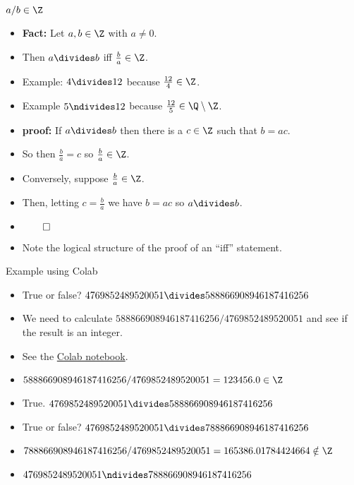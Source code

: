 \documentclass[handout]{beamer}
\begin{document}
\begin{frame}{$a/b \in \Z$}

\begin{itemize}
  \item \textbf{Fact:} Let $a,b\in\Z$ with $a\not=0$.
  \item Then $a\divides b$ iff $\frac{b}{a} \in \Z$.
  \item Example: $4 \divides 12$ because $\frac{12}{4} \in \Z$.
  \item Example $5 \ndivides 12$ because $\frac{12}{5} \in \Q \setminus \Z$.
  \item \textbf{proof:} If $a\divides b$ then there is a $c\in\Z$ such that
  $b = ac$.
  \item So then $\frac{b}{a} = c$ so $\frac{b}{a} \in \Z$.
  \item Conversely, suppose $\frac{b}{a} \in \Z$.
  \item Then, letting $c = \frac{b}{a}$ we have $b = a c$ so $a\divides b$.
  \item $\qed$
  \item Note the logical structure of the proof of an ``iff'' statement.
\end{itemize}

\end{frame}


\begin{frame}{Example using Colab}

\begin{itemize}
  \item True or false? $4769852489520051 \divides 588866908946187416256$
  \item We need to calculate $588866908946187416256 / 4769852489520051$ and see if the result is an integer.
  \item See the \href{https://colab.research.google.com/drive/17OJwKVBMd3lXX7huLPVGk2j2cjjXzyRy?usp=sharing}{Colab notebook}.
  \item $588866908946187416256 / 4769852489520051 = 123456.0 \in \Z$
  \item True. $4769852489520051 \divides 588866908946187416256$
  \item True or false? $4769852489520051 \divides 788866908946187416256$
  \item $788866908946187416256 / 4769852489520051 = 165386.01784424664 \notin \Z$
  \item $4769852489520051 \ndivides 788866908946187416256$
\end{itemize}

\end{frame}
\end{document}
